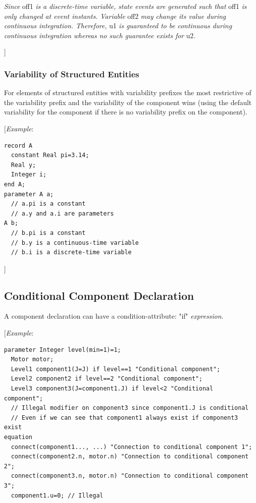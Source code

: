 \documentclass[10pt,a4paper]{report}
\def\doublelabel#1{\label{#1}\hypertarget{#1}{}}
\begin{document}
\emph{Since} off1 \emph{is a discrete-time variable, state events are
generated such that} off1 \emph{is only changed at event instants.
Variable} off2 \emph{may change its value during continuous integration.
Therefore,} u1 \emph{is guaranteed to be continuous during continuous
integration whereas no such guarantee exists for} u2\emph{.}

{]}

\subsubsection{Variability of Structured Entities}\doublelabel{variability-of-structured-entities}

For elements of structured entities with variability prefixes the most
restrictive of the variability prefix and the variability of the
component wins (using the default variability for the component if there
is no variability prefix on the component).

{[}\emph{Example}:
\begin{lstlisting}[language=modelica]
record A
  constant Real pi=3.14;
  Real y;
  Integer i;
end A;
parameter A a;
  // a.pi is a constant
  // a.y and a.i are parameters
A b;
  // b.pi is a constant
  // b.y is a continuous-time variable
  // b.i is a discrete-time variable
\end{lstlisting}

{]}

\subsection{Conditional Component Declaration}\doublelabel{conditional-component-declaration}

A component declaration can have a condition-attribute: "if"
\emph{expression}.

{[}\emph{Example}:
\begin{lstlisting}[language=modelica]
  parameter Integer level(min=1)=1;
  Motor motor;
  Level1 component1(J=J) if level==1 "Conditional component";
  Level2 component2 if level==2 "Conditional component";
  Level3 component3(J=component1.J) if level<2 "Conditional component";
  // Illegal modifier on component3 since component1.J is conditional
  // Even if we can see that component1 always exist if component3 exist
equation
  connect(component1..., ...) "Connection to conditional component 1";
  connect(component2.n, motor.n) "Connection to conditional component 2";
  connect(component3.n, motor.n) "Connection to conditional component 3";
  component1.u=0; // Illegal
\end{lstlisting}
\end{document}

